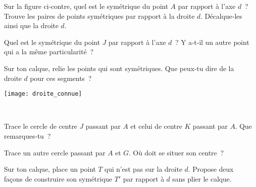 
\begin{activite}

\begin{minipage}[c]{0.64\linewidth}
\begin{partie}
Sur la figure ci‑contre, quel est le symétrique du point $A$ par rapport à l'axe $d$ ? \\[0.5em]
Trouve les paires de points symétriques par rapport à la droite $d$. Décalque‑les ainsi que la droite $d$.
\end{partie}

\begin{partie}
Quel est le symétrique du point $J$ par rapport à l'axe $d$ ? Y a‑t‑il un autre point qui a la même particularité ?
\end{partie}

\begin{partie}
Sur ton calque, relie les points qui sont symétriques. Que peux-tu dire de la droite $d$ pour ces segments ?
\end{partie}
 \end{minipage}
  \qquad \begin{minipage}[c]{0.30\linewidth}
  \texttt{[image: droite\_connue]}
  \end{minipage} \\
 

\begin{partie}
Trace le cercle de centre $J$ passant par $A$ et celui de centre $K$ passant par $A$. Que remarques‑tu ?
         
Trace un autre cercle passant par $A$ et $G$. Où doit se situer son centre ?
\end{partie}


\begin{partie}
Sur ton calque, place un point $T$ qui n'est pas sur la droite $d$. Propose deux façons de construire son symétrique $T'$ par rapport à $d$ sans plier le calque.
\end{partie}

\end{activite}


